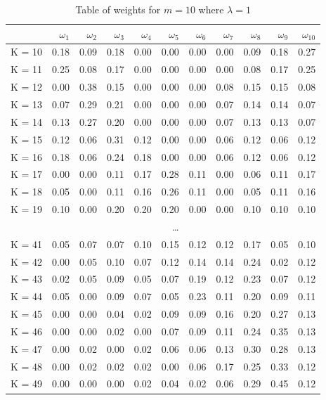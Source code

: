 \documentclass[a4paper,11pt]{article}
\begin{document}
\begin{table}[hh]
	\caption{Table of weights for $m=10$ where $\lambda = 1$}
	\centering
	\begin{tabular}{rrrrrrrrrrr}
		\hline
		& $\omega_1$ &  $\omega_2$ &  $\omega_3$ &  $\omega_4$ &  $\omega_5$ &  $\omega_6$ &  $\omega_7$ &  $\omega_8$ &  $\omega_9$ &  $\omega_10$ \\
		\hline
		K = 10 & 0.18 & 0.09 & 0.18 & 0.00 & 0.00 & 0.00 & 0.00 & 0.09 & 0.18 & 0.27 \\ 
		K = 11 & 0.25 & 0.08 & 0.17 & 0.00 & 0.00 & 0.00 & 0.00 & 0.08 & 0.17 & 0.25 \\ 
		K = 12 & 0.00 & 0.38 & 0.15 & 0.00 & 0.00 & 0.00 & 0.08 & 0.15 & 0.15 & 0.08 \\ 
		K = 13 & 0.07 & 0.29 & 0.21 & 0.00 & 0.00 & 0.00 & 0.07 & 0.14 & 0.14 & 0.07 \\ 
		K = 14 & 0.13 & 0.27 & 0.20 & 0.00 & 0.00 & 0.00 & 0.07 & 0.13 & 0.13 & 0.07 \\ 
		K = 15 & 0.12 & 0.06 & 0.31 & 0.12 & 0.00 & 0.00 & 0.06 & 0.12 & 0.06 & 0.12 \\ 
		K = 16 & 0.18 & 0.06 & 0.24 & 0.18 & 0.00 & 0.00 & 0.06 & 0.12 & 0.06 & 0.12 \\ 
		K = 17 & 0.00 & 0.00 & 0.11 & 0.17 & 0.28 & 0.11 & 0.00 & 0.06 & 0.11 & 0.17 \\ 
		K = 18 & 0.05 & 0.00 & 0.11 & 0.16 & 0.26 & 0.11 & 0.00 & 0.05 & 0.11 & 0.16 \\ 
		K = 19 & 0.10 & 0.00 & 0.20 & 0.20 & 0.20 & 0.00 & 0.00 & 0.10 & 0.10 & 0.10 \\ 
		&&&&&\dots\\
		K = 41 & 0.05 & 0.07 & 0.07 & 0.10 & 0.15 & 0.12 & 0.12 & 0.17 & 0.05 & 0.10 \\ 
		K = 42 & 0.00 & 0.05 & 0.10 & 0.07 & 0.12 & 0.14 & 0.14 & 0.24 & 0.02 & 0.12 \\ 
		K = 43 & 0.02 & 0.05 & 0.09 & 0.05 & 0.07 & 0.19 & 0.12 & 0.23 & 0.07 & 0.12 \\ 
		K = 44 & 0.05 & 0.00 & 0.09 & 0.07 & 0.05 & 0.23 & 0.11 & 0.20 & 0.09 & 0.11 \\ 
		K = 45 & 0.00 & 0.00 & 0.04 & 0.02 & 0.09 & 0.09 & 0.16 & 0.20 & 0.27 & 0.13 \\ 
		K = 46 & 0.00 & 0.00 & 0.02 & 0.00 & 0.07 & 0.09 & 0.11 & 0.24 & 0.35 & 0.13 \\ 
		K = 47 & 0.00 & 0.02 & 0.00 & 0.02 & 0.06 & 0.06 & 0.13 & 0.30 & 0.28 & 0.13 \\ 
		K = 48 & 0.00 & 0.02 & 0.02 & 0.02 & 0.00 & 0.06 & 0.17 & 0.25 & 0.33 & 0.12 \\ 
		K = 49 & 0.00 & 0.00 & 0.00 & 0.02 & 0.04 & 0.02 & 0.06 & 0.29 & 0.45 & 0.12 \\ 
		\hline
	\end{tabular}
\end{table}
\end{document}
